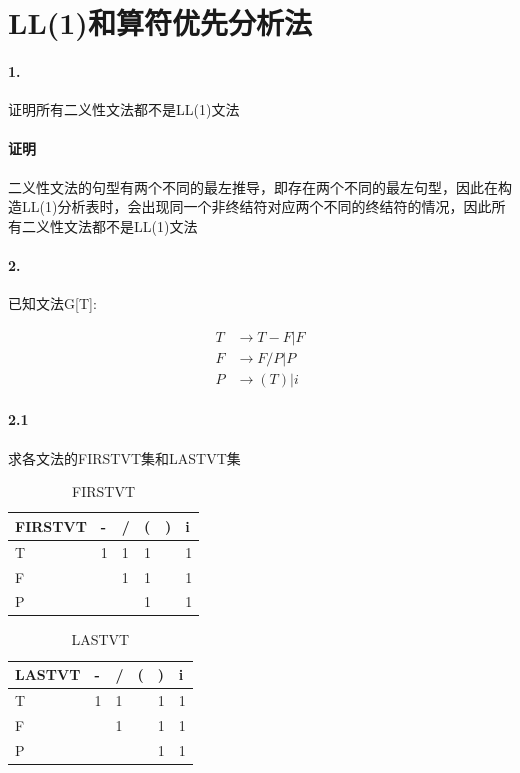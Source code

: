 \documentclass[UTF8]{ctexart} %
\begin{document}
\section{LL(1)和算符优先分析法}

\paragraph{1.} 证明所有二义性文法都不是LL(1)文法

\paragraph{证明} 二义性文法的句型有两个不同的最左推导，即存在两个不同的最左句型，因此在构造LL(1)分析表时，会出现同一个非终结符对应两个不同的终结符的情况，因此所有二义性文法都不是LL(1)文法

\paragraph{2.} 已知文法G[T]:

\begin{equation}
    \begin{aligned}
        T & \rightarrow T-F|F \\
        F & \rightarrow F/P|P \\
        P & \rightarrow (T)|i
    \end{aligned}
\end{equation}

\paragraph{2.1} 求各文法的FIRSTVT集和LASTVT集

\begin{table}[H]
    \centering
    \begin{tabular}{|p{2cm}<{\centering}|p{1cm}<{\centering}|p{1cm}<{\centering}|p{1cm}<{\centering}|p{1cm}<{\centering}|p{1cm}<{\centering}|}
        \hline
        FIRSTVT & - & / & ( & ) & i \\
        \hline
        T       & 1 & 1 & 1 &   & 1 \\
        F       &   & 1 & 1 &   & 1 \\
        P       &   &   & 1 &   & 1 \\
        \hline
    \end{tabular}
    \caption{FIRSTVT}
\end{table}

\begin{table}[H]
    \centering
    \begin{tabular}{|p{2cm}<{\centering}|p{1cm}<{\centering}|p{1cm}<{\centering}|p{1cm}<{\centering}|p{1cm}<{\centering}|p{1cm}<{\centering}|}
        \hline
        LASTVT & - & / & ( & ) & i \\
        \hline
        T      & 1 & 1 &   & 1 & 1 \\
        F      &   & 1 &   & 1 & 1 \\
        P      &   &   &   & 1 & 1 \\
        \hline
    \end{tabular}
    \caption{LASTVT}
\end{table}
\end{document}
